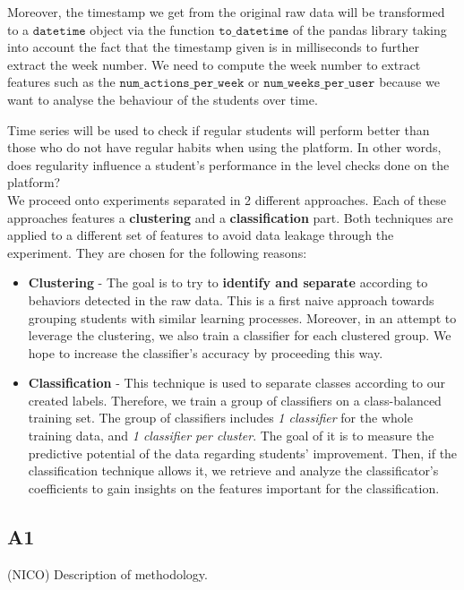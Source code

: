 \documentclass[sigplan,screen]{acmart}
\begin{document}
Moreover, the timestamp we get from the original raw data will be transformed to a $\texttt{datetime}$ object via the function $\texttt{to\_datetime}$ of the pandas library taking into account the fact that the timestamp given is in milliseconds to further extract the week number. We need to compute the week number to extract features such as the $\texttt{num\_actions\_per\_week}$ or $\texttt{num\_weeks\_per\_user}$ because we want to analyse the behaviour of the students over time.

Time series will be used to check if regular students will perform better than those who do not have regular habits when using the platform. In other words, does regularity influence a student’s performance in the level checks done on the platform?\\

We proceed onto experiments separated in 2 different approaches. Each of these approaches features a \textbf{clustering} and a \textbf{classification} part. Both techniques are applied to a different set of features to avoid data leakage through the experiment. They are chosen for the following reasons:

\begin{itemize}
    \item \textbf{Clustering} - The goal is to try to \textbf{identify and separate} according to behaviors detected in the raw data. This is a first naive approach towards grouping students with similar learning processes. Moreover, in an attempt to leverage the clustering, we also train a classifier for each clustered group. We hope to increase the classifier's accuracy by proceeding this way.
    \item \textbf{Classification} - This technique is used to separate classes according to our created labels. Therefore, we train a group of classifiers on a class-balanced training set. The group of classifiers includes \textit{1 classifier} for the whole training data, and \textit{1 classifier per cluster}. The goal of it is to measure the predictive potential of the data regarding students' improvement. Then, if the classification technique allows it, we retrieve and analyze the classificator's coefficients to gain insights on the features important for the classification.
\end{itemize}

\subsection{A1}\label{subsec:A1}
{\color{red} (NICO) Description of methodology.}
\end{document}
